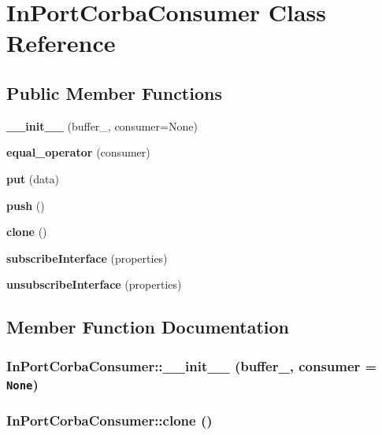 \section{In\-Port\-Corba\-Consumer Class Reference}
\label{classInPortCorbaConsumer}
\subsection*{Public Member Functions}
\begin{CompactItemize}
\item 
{\bf \_\-\_\-init\_\-\_\-} (buffer\_\-, consumer=None)
\item 
{\bf equal\_\-operator} (consumer)
\item 
{\bf put} (data)
\item 
{\bf push} ()
\item 
{\bf clone} ()
\item 
{\bf subscribe\-Interface} (properties)
\item 
{\bf unsubscribe\-Interface} (properties)
\end{CompactItemize}


\subsection{Member Function Documentation}
\subsubsection{\setlength{\rightskip}{0pt plus 5cm}In\-Port\-Corba\-Consumer::\_\-\_\-init\_\-\_\- (buffer\_\-, consumer = {\tt None})}\label{classInPortCorbaConsumer_InPortCorbaConsumera0}


\subsubsection{\setlength{\rightskip}{0pt plus 5cm}In\-Port\-Corba\-Consumer::clone ()}\label{classInPortCorbaConsumer_InPortCorbaConsumera4}


